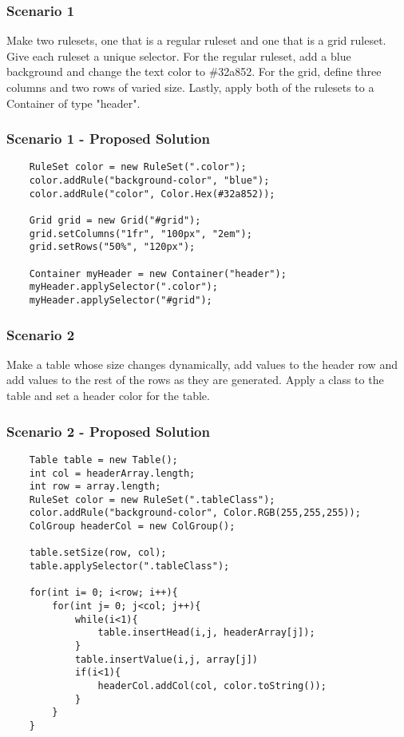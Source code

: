 \documentclass[12pt]{article}
\begin{document}
\subsubsection{Scenario 1}
Make two rulesets, one that is a regular ruleset and one that is a grid ruleset. Give each ruleset a unique selector. For the regular ruleset, add a blue background and change the text color to \#32a852. For the grid, define three columns and two rows of varied size. Lastly, apply both of the rulesets to a Container of type "header".

\subsubsection{Scenario 1 - Proposed Solution}

\begin{lstlisting}
    RuleSet color = new RuleSet(".color");
    color.addRule("background-color", "blue");
    color.addRule("color", Color.Hex(#32a852));

    Grid grid = new Grid("#grid");
    grid.setColumns("1fr", "100px", "2em");
    grid.setRows("50%", "120px");

    Container myHeader = new Container("header");
    myHeader.applySelector(".color");
    myHeader.applySelector("#grid");
\end{lstlisting}


\subsubsection{Scenario 2}
Make a table whose size changes dynamically, add values to the header row and add values to the rest of the rows as they are generated. Apply a class to the table and set a header color for the table.


\subsubsection{Scenario 2 - Proposed Solution}

\begin{lstlisting}
    Table table = new Table();
    int col = headerArray.length;
    int row = array.length;
    RuleSet color = new RuleSet(".tableClass");
    color.addRule("background-color", Color.RGB(255,255,255));
    ColGroup headerCol = new ColGroup();

    table.setSize(row, col);
    table.applySelector(".tableClass");

    for(int i= 0; i<row; i++){
        for(int j= 0; j<col; j++){
            while(i<1){
                table.insertHead(i,j, headerArray[j]);
            }
            table.insertValue(i,j, array[j])
            if(i<1){
                headerCol.addCol(col, color.toString());
            }
        }
    }
\end{lstlisting}
\end{document}
